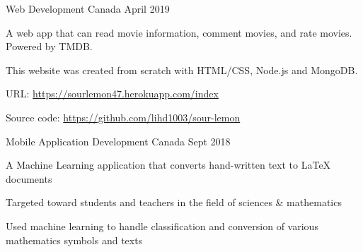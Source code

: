 

\begin{cventries}

  \cventry
    {Web Development} %
    {} %
    {Canada} %
    {April 2019} %
    {
      \begin{cvitems} %
        \item {A web app that can read movie information, comment movies, and rate movies. Powered by TMDB. }
        \item {This website was created from scratch with HTML/CSS, Node.js and MongoDB.}
        \item {URL: \url{https://sourlemon47.herokuapp.com/index}}
        \item {Source code: \url{https://github.com/lihd1003/sour-lemon}}
      \end{cvitems}
    }

    \cventry
    {Mobile Application Development} %
    {} %
    {Canada} %
    {Sept 2018} %
    {
      \begin{cvitems} %
        \item {A Machine Learning application that converts hand-written text to LaTeX documents }
        \item {Targeted toward students and teachers in the field of sciences & mathematics }
        \item {Used machine learning to handle classification and conversion of various mathematics symbols and texts }
      \end{cvitems}
    }



\end{cventries}
